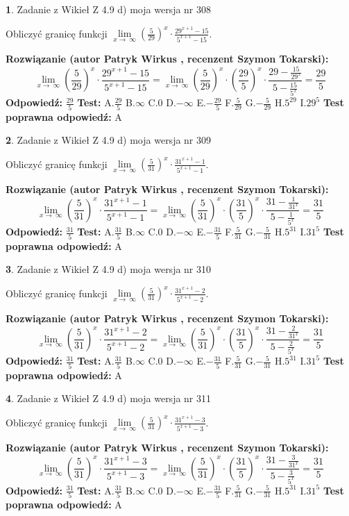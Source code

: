\documentclass[12pt, a4paper]{article}
\theoremstyle{definition} %
\newtheorem{zad}{}
\newcommand{\zadStart}[1]{\begin{zad}#1\newline}
\newcommand{\zadStop}{\end{zad}}
\newcommand{\rozwStart}[2]{\noindent \textbf{Rozwiązanie (autor #1 , recenzent #2): }\newline}
\newcommand{\rozwStop}{\newline}
\newcommand{\odpStart}{\noindent \textbf{Odpowiedź:}\newline}
\newcommand{\odpStop}{\newline}
\newcommand{\testStart}{\noindent \textbf{Test:}\newline}
\newcommand{\testStop}{\newline}
\newcommand{\kluczStart}{\noindent \textbf{Test poprawna odpowiedź:}\newline}
\newcommand{\kluczStop}{\newline}
\begin{document}
\zadStart{Zadanie z Wikieł Z 4.9 d) moja wersja nr 308}


Obliczyć granicę funkcji  $\lim\limits_{x\to\ \infty}(\frac{5}{29})^{x}\cdot\frac{29^{x+1}-15}{5^{x+1}-15}$.
\zadStop
\rozwStart{Patryk Wirkus}{Szymon Tokarski}
$$\lim\limits_{x\to\ \infty}(\frac{5}{29})^{x}\cdot\frac{29^{x+1}-15}{5^{x+1}-15}=\lim\limits_{x\to\ \infty}(\frac{5}{29})^{x}\cdot(\frac{29}{5})^{x} \cdot \frac{29-\frac{15}{29^{x}}}{5-\frac{15}{5^{x}}} = \frac{29}{5}$$
\rozwStop
\odpStart
$\frac{29}{5}$
\odpStop
\testStart
A.$\frac{29}{5}$ B.$\infty$ C.$0$ D.$-\infty$ E.$-\frac{29}{5}$
F.$\frac{5}{29}$ G.$-\frac{5}{29}$
H.$5^{29}$
I.$29^{5}$
\testStop
\kluczStart
A
\kluczStop



\zadStart{Zadanie z Wikieł Z 4.9 d) moja wersja nr 309}


Obliczyć granicę funkcji  $\lim\limits_{x\to\ \infty}(\frac{5}{31})^{x}\cdot\frac{31^{x+1}-1}{5^{x+1}-1}$.
\zadStop
\rozwStart{Patryk Wirkus}{Szymon Tokarski}
$$\lim\limits_{x\to\ \infty}(\frac{5}{31})^{x}\cdot\frac{31^{x+1}-1}{5^{x+1}-1}=\lim\limits_{x\to\ \infty}(\frac{5}{31})^{x}\cdot(\frac{31}{5})^{x} \cdot \frac{31-\frac{1}{31^{x}}}{5-\frac{1}{5^{x}}} = \frac{31}{5}$$
\rozwStop
\odpStart
$\frac{31}{5}$
\odpStop
\testStart
A.$\frac{31}{5}$ B.$\infty$ C.$0$ D.$-\infty$ E.$-\frac{31}{5}$
F.$\frac{5}{31}$ G.$-\frac{5}{31}$
H.$5^{31}$
I.$31^{5}$
\testStop
\kluczStart
A
\kluczStop



\zadStart{Zadanie z Wikieł Z 4.9 d) moja wersja nr 310}


Obliczyć granicę funkcji  $\lim\limits_{x\to\ \infty}(\frac{5}{31})^{x}\cdot\frac{31^{x+1}-2}{5^{x+1}-2}$.
\zadStop
\rozwStart{Patryk Wirkus}{Szymon Tokarski}
$$\lim\limits_{x\to\ \infty}(\frac{5}{31})^{x}\cdot\frac{31^{x+1}-2}{5^{x+1}-2}=\lim\limits_{x\to\ \infty}(\frac{5}{31})^{x}\cdot(\frac{31}{5})^{x} \cdot \frac{31-\frac{2}{31^{x}}}{5-\frac{2}{5^{x}}} = \frac{31}{5}$$
\rozwStop
\odpStart
$\frac{31}{5}$
\odpStop
\testStart
A.$\frac{31}{5}$ B.$\infty$ C.$0$ D.$-\infty$ E.$-\frac{31}{5}$
F.$\frac{5}{31}$ G.$-\frac{5}{31}$
H.$5^{31}$
I.$31^{5}$
\testStop
\kluczStart
A
\kluczStop



\zadStart{Zadanie z Wikieł Z 4.9 d) moja wersja nr 311}


Obliczyć granicę funkcji  $\lim\limits_{x\to\ \infty}(\frac{5}{31})^{x}\cdot\frac{31^{x+1}-3}{5^{x+1}-3}$.
\zadStop
\rozwStart{Patryk Wirkus}{Szymon Tokarski}
$$\lim\limits_{x\to\ \infty}(\frac{5}{31})^{x}\cdot\frac{31^{x+1}-3}{5^{x+1}-3}=\lim\limits_{x\to\ \infty}(\frac{5}{31})^{x}\cdot(\frac{31}{5})^{x} \cdot \frac{31-\frac{3}{31^{x}}}{5-\frac{3}{5^{x}}} = \frac{31}{5}$$
\rozwStop
\odpStart
$\frac{31}{5}$
\odpStop
\testStart
A.$\frac{31}{5}$ B.$\infty$ C.$0$ D.$-\infty$ E.$-\frac{31}{5}$
F.$\frac{5}{31}$ G.$-\frac{5}{31}$
H.$5^{31}$
I.$31^{5}$
\testStop
\kluczStart
A
\kluczStop
\end{document}

